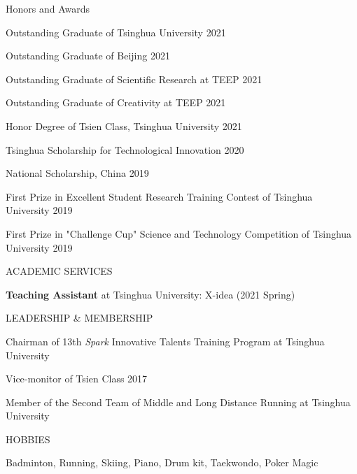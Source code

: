 \documentclass{resume} %
\begin{document}
	\begin{rSection}{Honors and Awards} {} \itemsep -2pt {}  
		\item Outstanding Graduate of Tsinghua University \hfill{2021}
		\item Outstanding Graduate of Beijing \hfill{2021}
		\item Outstanding Graduate of Scientific Research at TEEP \hfill{2021}
		\item Outstanding Graduate of Creativity at TEEP \hfill{2021}
		\item Honor Degree of Tsien Class, Tsinghua University \hfill{2021}
		\item Tsinghua Scholarship for Technological Innovation \hfill{2020}
		\item National Scholarship, China \hfill{2019}
		\item First Prize in Excellent Student Research Training Contest of Tsinghua University \hfill{2019}
		\item First Prize in "Challenge Cup" Science and Technology Competition of Tsinghua University \hfill{2019}
	\end{rSection}

	\begin{rSection}{ACADEMIC SERVICES}
		\item \textbf{Teaching Assistant} at Tsinghua University: X-idea (2021 Spring)
	\end{rSection}

	\begin{rSection}{LEADERSHIP \& MEMBERSHIP}
		\item Chairman of 13th \textsl{Spark} Innovative Talents Training Program at Tsinghua University
		\item Vice-monitor of Tsien Class 2017
		\item Member of the Second Team of Middle and Long Distance Running at Tsinghua University
	\end{rSection}

	\begin{rSection}{HOBBIES}
		\item Badminton, Running, Skiing, Piano, Drum kit, Taekwondo, Poker Magic
	\end{rSection}
	
\end{document}
